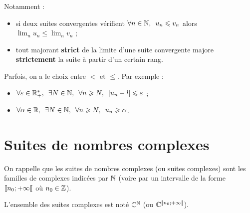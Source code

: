 Notamment : \begin{itemize}
\item si deux suites convergentes vérifient \(\quantifs{\forall n\in\N}u_n\leq v_n\) alors \(\lim_nu_n\leq\lim_nv_n\) ; \\

\item tout majorant \textbf{strict} de la limite d'une suite convergente majore \textbf{strictement} la suite à partir d'un certain rang. \\
\end{itemize}

Parfois, on a le choix entre \(<\) et \(\leq\). Par exemple : \begin{itemize}
\item \(\quantifs{\forall\epsilon\in\Rps;\exists N\in\N;\forall n\geq N}\abs{u_n-l}\leq\epsilon\) ; \\

\item \(\quantifs{\forall\alpha\in\R;\exists N\in\N;\forall n\geq N}u_n\geq\alpha\).
\end{itemize}

\section{Suites de nombres complexes}

On rappelle que les suites de nombres complexes (ou suites complexes) sont les familles de complexes indicées par \(\mathbb{N}\) (voire par un intervalle de la forme \(\left\llbracket n_0;+\infty\right\llbracket\) où \(n_0\in\mathbb{Z}\)).

L'ensemble des suites complexes est noté \(\mathbb{C}^{\mathbb{N}}\) (ou \(\mathbb{C}^{\left\llbracket n_0;+\infty\right\llbracket}\)).

